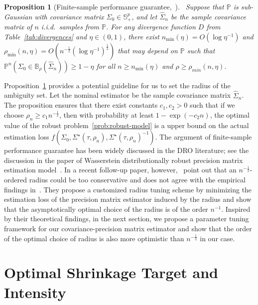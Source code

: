 \documentclass[11pt]{article}
\def\P{\mathbb{P}}
\def\S{\mathbb{S}}
\def\PSD{{\S^k_{++}}}
\newtheorem{proposition}{Proposition}
\newcommand{\opt}{^\star}
\def\P{\mathbb{P}}
\def\S{\mathbb{S}}
\def\PSD{{\S^p_{+}}}
\newcommand{\wh}{\widehat}
\begin{document}
\begin{proposition}[Finite-sample performance guarantee,{~\cite[Proposition 8]{ref:yue2024geometric}}]~\label{prop:finite-guarantee}
    Suppose that $\P$ is sub-Gaussian with covariance matrix $\Sigma_0\in\PSD$, and let $\wh\Sigma_n$ be the sample covariance matrix of $n$ i.i.d.~samples from $\mathbb{P}$. For any divergence function $D$ from Table~\ref{tab:divergences} and $\eta\in (0,1)$, there exist $n_{\min}(\eta)=O(\log\eta^{-1})$ and $ \rho_{\min}(n,\eta) = O(n^{-\frac{1}{2}}(\log\eta^{-1})^{\frac{1}{2}})$ that may depend on $\P$ such that $\P^n\left(\Sigma_0\in\mathbb{B}_ \rho(\wh\Sigma_n)\right)\geq 1-\eta$ for all $n\geq n_{\min}(\eta)$ and $ \rho\geq  \rho_{min}(n,\eta)$.
    
\end{proposition}
Proposition~\ref{prop:finite-guarantee} provides a potential guideline for us to set the radius of the ambiguity set. Let the nominal estimator be the sample covariance matrix $\wh\Sigma_n$. The proposition ensures that there exist constants $c_1,c_2>0$ such that if we choose $ \rho_n \geq c_1 n^{-\frac{1}{2}}$, then with probability at least $1-\exp(-c_2 n)$, the optimal value of the robust problem~\eqref{prob:robust-model} is a upper bound on the actual estimation loss $f(\Sigma_0, \Sigma\opt(\tau, \rho_n), \Sigma\opt(\tau, \rho_n)^{-1})$. The argument of finite-sample performance guarantee has been widely discussed in the DRO literature; see the discussion in the paper of Wasserstein distributionally robust precision matrix estimation model~\citep{ref:nguyen2022distributionally}. In a recent follow-up paper, however,~\cite{ref:BLANCHET2019618} point out that an $n^{-\frac{1}{2}}$-ordered radius could be too conservative and does not agree with the empirical findings in~\cite{ref:nguyen2022distributionally}. They propose a customized radius tuning scheme by minimizing the estimation loss of the precision matrix estimator induced by the radius and show that the asymptotically optimal choice of the radius is of the order $n^{-1}$. Inspired by their theoretical findings, in the next section, we propose a parameter tuning framework for our covariance-precision matrix estimator and show that the order of the optimal choice of radius is also more optimistic than $n^{-\frac{1}{2}}$ in our case.






\section{Optimal Shrinkage Target and Intensity}\label{sec:tuning}
\end{document}
